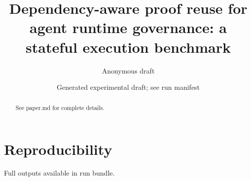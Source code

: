 \documentclass[11pt]{article}
\title{Dependency-aware proof reuse for agent runtime governance: a stateful execution benchmark}
\author{Anonymous draft}
\date{Generated experimental draft; see run manifest}
\begin{document}
\maketitle
\begin{abstract}See paper.md for complete details.\end{abstract}
\section{Reproducibility}Full outputs available in run bundle.
\end{document}
